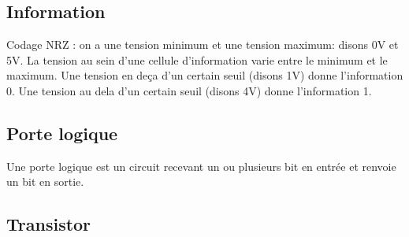 \documentclass[10pt,a4paper]{article}
\begin{document}
\subsection{Information}
Codage NRZ : on a une tension minimum et une tension maximum: disons 0V et 5V.
La tension au sein d'une cellule d'information varie entre le minimum et le maximum.
Une tension en deça d'un certain seuil (disons 1V) donne l'information 0.
Une tension au dela d'un certain seuil (disons 4V) donne l'information 1.
\subsection{Porte logique}
Une porte logique est un circuit recevant un ou plusieurs bit en entrée et renvoie un bit en sortie.
\subsection{Transistor}
\end{document}
